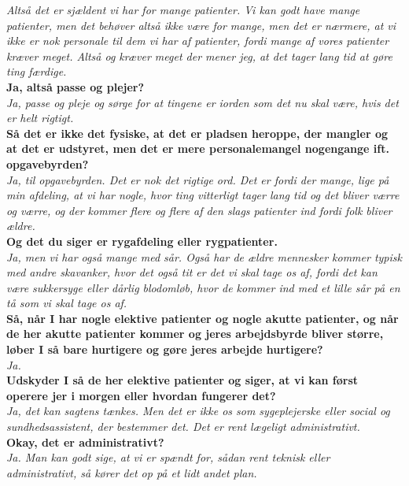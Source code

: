 \noindent
\textit{Altså det er sjældent vi har for mange patienter. Vi kan godt have mange patienter, men det behøver altså ikke være for mange, men det er nærmere, at vi ikke er nok personale til dem vi har af patienter, fordi mange af vores patienter kræver meget. Altså og kræver meget der mener jeg, at det tager lang tid at gøre ting færdige.}\\ 
\noindent
\textbf{Ja, altså passe og plejer?}\\
\noindent
\textit{Ja, passe og pleje og sørge for at tingene er iorden som det nu skal være, hvis det er helt rigtigt.}\\
\noindent
\textbf{Så det er ikke det fysiske, at det er pladsen heroppe, der mangler og at det er udstyret, men det er mere personalemangel nogengange ift. opgavebyrden?}\\
\noindent
\textit{Ja, til opgavebyrden. Det er nok det rigtige ord. Det er fordi der mange, lige på min afdeling, at vi har nogle, hvor ting vitterligt tager lang tid og det bliver værre og værre, og der kommer flere og flere af den slags patienter ind fordi folk bliver ældre.}\\
\noindent
\textbf{Og det du siger er rygafdeling eller rygpatienter.}\\
\noindent
\textit{Ja, men vi har også mange med sår. Også har de ældre mennesker kommer typisk med andre skavanker, hvor det også tit er det vi skal tage os af, fordi det kan være sukkersyge eller dårlig blodomløb, hvor de kommer ind med et lille sår på en tå som vi skal tage os af.}\\
\noindent
\textbf{Så, når I har nogle elektive patienter og nogle akutte patienter, og når de her akutte patienter kommer og jeres arbejdsbyrde bliver større, løber I så bare hurtigere og gøre jeres arbejde hurtigere?}\\
\noindent
\textit{Ja.}\\
\noindent
\textbf{Udskyder I så de her elektive patienter og siger, at vi kan først operere jer i morgen eller hvordan fungerer det?}\\
\noindent
\textit{Ja, det kan sagtens tænkes. Men det er ikke os som sygeplejerske eller social og sundhedsassistent, der bestemmer det. Det er rent lægeligt administrativt.}\\
\noindent
\textbf{Okay, det er administrativt?}\\
\noindent
\textit{Ja. Man kan godt sige, at vi er spændt for, sådan rent teknisk eller administrativt, så kører det op på et lidt andet plan.}\\
